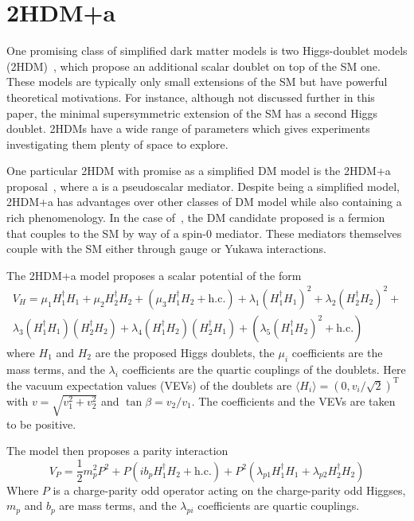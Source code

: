 \section{2HDM+a}
\label{section:2hdma}
One promising class of simplified dark matter models is two Higgs-doublet models (2HDM)~\cite{thdm2012}, which propose an additional scalar doublet on top of the SM one. These models are typically only small extensions of the SM but have powerful theoretical motivations. For instance, although not discussed further in this paper, the minimal supersymmetric extension of the SM has a second Higgs doublet. 2HDMs have a wide range of parameters which gives experiments investigating them plenty of space to explore.

One particular 2HDM with promise as a simplified DM model is the 2HDM+a proposal~\cite{thdma2017}, where a is a pseudoscalar mediator.
Despite being a simplified model, 2HDM+a has advantages over other classes of DM model while also containing a rich phenomenology. In the case of~\cite{thdma2017}, the DM candidate proposed is a fermion that couples to the SM by way of a spin-$0$ mediator. These mediators themselves couple with the SM either through gauge or Yukawa interactions.

The 2HDM+a model proposes a scalar potential of the form
\begin{multline}
    V_H = \mu_1H_1^\dagger H_1 + \mu_2H_2^\dagger H_2 + (\mu_3H_1^\dagger H_2 + \text{h.c.}) + \lambda_1(H_1^\dagger H_1)^2 + \lambda_2(H_2^\dagger H_2)^2 + \\ \lambda_3(H_1^\dagger H_1)(H_2^\dagger H_2) + \lambda_4(H_1^\dagger H_2)(H_2^\dagger H_1) + (\lambda_5(H_1^\dagger H_2)^2 + \text{h.c.})
\end{multline}
where $H_1$ and $H_2$ are the proposed Higgs doublets, the $\mu_i$ coefficients are the mass terms, and the $\lambda_i$ coefficients are the quartic couplings of the doublets. Here the vacuum expectation values (VEVs) of the doublets are $\langle H_i\rangle = (0, v_i/\sqrt{2})^\mathrm{T}$ with $v = \sqrt{v_1^2+v^2_2}$ and $\tan\beta = v_2/v_1$. The coefficients and the VEVs are taken to be positive. 

The model then proposes a parity interaction
\begin{equation}
    V_P = \frac{1}{2}m_p^2P^2+P(ib_pH_1^\dagger H_2+\text{h.c.})+P^2(\lambda_{p1}H_1^\dagger H_1+\lambda_{p2}H_2^\dagger H_2)
\end{equation}
Where $P$ is a charge-parity odd operator acting on the charge-parity odd Higgses, $m_p$ and $b_p$ are mass terms, and the $\lambda_{pi}$ coefficients are quartic couplings.

